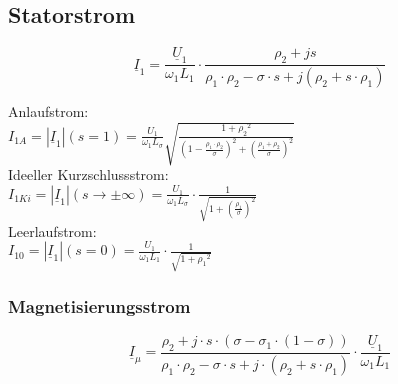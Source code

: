 \begin{sectionbox}
\subsection{Statorstrom}
\begin{emphbox}
\[\underline{I}_1 = \frac{\underline{U}_1}{\omega_1 L_1} \cdot \frac{\rho_2 +js}{\rho_1\cdot\rho_2 -\sigma\cdot s+j(\rho_2 +s\cdot \rho_1)}\]
\end{emphbox}
Anlaufstrom:\\
$I_{1A} = |\underline{I}_1|(s=1) = \frac{U_1}{\omega_1 L_\sigma}\sqrt{\frac{1+{\rho_2}^2}{\left(1-\frac{\rho_1\cdot\rho_2}{\sigma}\right)^2 +\left(\frac{\rho_1+\rho_2}{\sigma}\right)^2}}$\\
Ideeller Kurzschlussstrom:\\
$I_{1Ki} = |\underline{I}_1|(s\rightarrow\pm\infty) = \frac{U_1}{\omega_1 L_\sigma}\cdot \frac{1}{\sqrt{1+\left( \frac{\rho_1}{\sigma}\right)^2}}$\\
Leerlaufstrom:\\$I_{10} = |\underline{I}_1|(s=0) = \frac{U_1}{\omega_1 L_1}\cdot \frac{1}{\sqrt{1+{\rho_1}^2}}$

\subsubsection{Magnetisierungsstrom}
\[\underline I_\mu = \frac{\rho_2 + j\cdot s\cdot(\sigma - \sigma_1\cdot(1-\sigma))}{\rho_1\cdot\rho_2 - \sigma\cdot s + j\cdot(\rho_2 + s\cdot\rho_1)}\cdot\frac{\underline U_1}{\omega_1 L_1}\]
\end{sectionbox}

